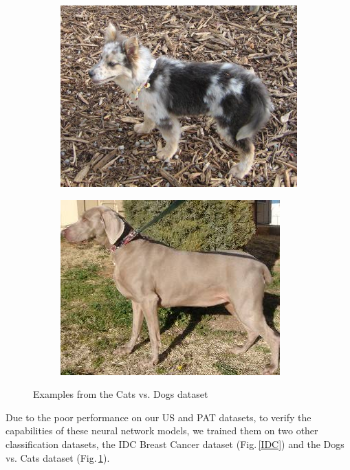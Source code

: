 \begin{figure}[h]
\begin{subfigure}[b]{.2\linewidth}
\end{subfigure}
\begin{subfigure}[b]{.2\linewidth}
\includegraphics[width=\linewidth]{Figs/dog4133.jpg}
\end{subfigure}
\begin{subfigure}[b]{.2\linewidth}
\includegraphics[width=\linewidth]{Figs/dog1178.jpg}
\end{subfigure}
\caption{Examples from the Cats vs. Dogs dataset}
\label{catdog}
\end{figure}

Due to the poor performance on our US and PAT datasets, to verify the capabilities of these neural network models, we trained them on two other classification datasets, the IDC Breast Cancer dataset \citep{Janowczyk2016} (Fig.\,\ref{IDC}) and the Dogs vs. Cats dataset \citep{catdog}  (Fig.\,\ref{catdog}).


